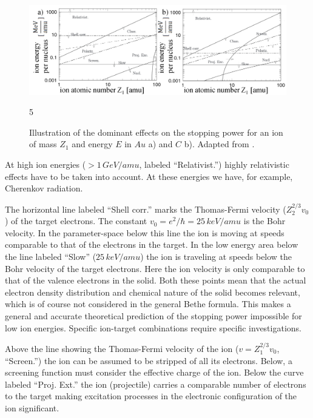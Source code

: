 \begin{figure}
	\centering
		\includegraphics[width=.95\textwidth]{images/StoppinginAuandC.png}
	\caption{Illustration of the dominant effects on the stopping power for an ion of mass $Z_1$ and energy $E$ in $Au$ a) and $C$ b). Adapted from \cite{sigmund_stopping_2004}.} 
	\label{stopping}
5\end{figure} 

At high ion energies ($ > 1\,GeV/amu$, labeled ``Relativist.'') highly relativistic effects have to be taken into account. At these energies we have, for example, Cherenkov radiation. 


The horizontal line labeled ``Shell corr.'' marks the Thomas-Fermi velocity ($Z_2^{2/3}v_0$) of the target electrons. The constant $v_0 = e^2/\hbar = 25\,keV/amu$ is the Bohr velocity. In the parameter-space below this line the ion is moving at speeds comparable to that of the electrons in the target. In the low energy area below the line labeled ``Slow'' ($25\,keV/amu$) the ion is traveling at speeds below the Bohr velocity of the target electrons. Here the ion velocity is only comparable to that of the valence electrons in the solid. Both these points mean that the actual electron density distribution and chemical nature of the solid becomes relevant, which is of course not considered in the general Bethe formula. This makes a general and accurate theoretical prediction of the stopping power impossible for low ion energies. Specific ion-target combinations require specific investigations.

Above the line showing the Thomas-Fermi velocity of the ion ($v = Z_1^{2/3}v_0$, ``Screen.'') the ion can be assumed to be stripped of all its electrons. Below, a screening function must consider the effective charge of the ion. Below the curve labeled ``Proj. Ext.'' the ion (projectile) carries a comparable number of electrons to the target making excitation processes in the electronic configuration of the ion significant.


